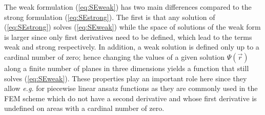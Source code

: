 The weak formulation (\ref{eq:SEweak}) has two main differences compared to the strong formulation (\ref{eq:SEstrong}).
The first is that any solution of (\ref{eq:SEstrong}) solves (\ref{eq:SEweak}) while the space of solutions of the weak form is larger since only first derivatives need to be defined, which lead to the terms weak and strong respectively.
In addition, a weak solution is defined only up to a cardinal number of zero; hence changing the values of a given solution $\Psi(\vec{r})$ along a finite number of planes in three dimensions yields a function that still solves (\ref{eq:SEweak}).
These properties play an important role here since they allow \textit{e.g.} for piecewise linear ansatz functions as they are commonly used in the FEM scheme which do not have a second derivative and whose first derivative is undefined on areas with a cardinal number of zero.

